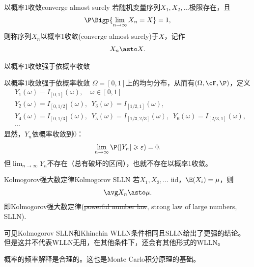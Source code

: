 
\begin{definition}{以概率1收敛}{converge almost surely}
	若随机变量序列$X_1,X_2,\ldots$极限存在，且
	\begin{equation}
		\P\Bigp{\lim_{n\to\infty}X_n=X}=1,
	\end{equation}
	则称序列$X_n$以概率1收敛(converge almost surely)于$X$，记作
	\begin{equation}
		X_n\asto X.
	\end{equation}
\end{definition}

\begin{corollary}
	以概率1收敛强于依概率收敛
\end{corollary}

\begin{example}{以概率1收敛强于依概率收敛}{}
	$\Omega=[0,1]$上的均匀分布，从而有$(\Omega,\cF,\P)$，定义
	\begin{align*}
		&Y_1(\omega)=I_{[0,1]}(\omega),\quad\omega\in[0,1]\\
		&Y_2(\omega)=I_{[0,1/2]}(\omega),\enspace Y_3(\omega)=I_{[1/2,1]}(\omega),\\
		&Y_4(\omega)=I_{[0,1/3]}(\omega),\enspace Y_5(\omega)=I_{[1/3,2/3]}(\omega),\enspace Y_6(\omega)=I_{[2/3,1]}(\omega),\\
		&\cdots
	\end{align*}
	显然，$Y_n$依概率收敛到0：
	\[
		\lim_{n\to\infty}\P(|Y_n|\geqslant\varepsilon)=0.
	\]
	但$\lim_{n\to\infty}Y_n$不存在（总有破坏的区间），也就不存在以概率1收敛。
\end{example}

\begin{theorem}{Kolmogorov强大数定律}{Kolmogorov SLLN}
	若$X_1,X_2,\ldots$ iid，$\E(X_i)=\mu$，则 
	\begin{equation}
		\avg X_n\asto\mu.
	\end{equation}
	即Kolmogorov强大数定律(\sout{powerful number law}, strong law of large numbers, SLLN).
\end{theorem}

\begin{remark}
	可见Kolmogorov SLLN和Khinchin WLLN条件相同且SLLN给出了更强的结论。
	但是这并不代表WLLN无用，在其他条件下，还会有其他形式的WLLN。
\end{remark}

\begin{corollary}
	概率的频率解释是合理的。这也是Monte Carlo积分原理的基础。
\end{corollary}

